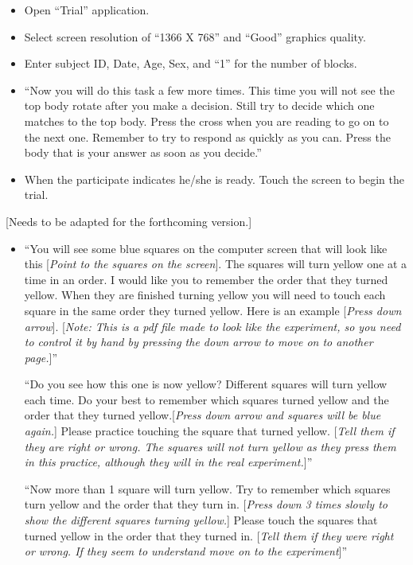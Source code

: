 \documentclass[idxtotoc,hyperref,openany]{labbook} %
\begin{document}
\begin{itemize}
\item Open ``Trial'' application.

\item Select screen resolution of ``1366 X 768'' and ``Good'' graphics quality.

\item Enter subject ID, Date, Age, Sex, and ``1'' for the number of blocks.

\item ``Now you will do this task a few more times. This time you will not see the top body rotate after you make a decision. Still try to decide which one matches to the top body. Press the cross when you are reading to go on to the next one. Remember to try to respond as quickly as you can. Press the body that is your answer as soon as you decide.''

\item When the participate indicates he/she is ready.  Touch the screen to begin the trial.

\end{itemize}




[Needs to be adapted for the forthcoming version.]

\begin{itemize}

\item ``You will see some blue squares on the computer screen that will look like this [\emph{Point to the squares on the screen}].  The squares will turn yellow one at a time in an order. I would like you to remember the order that they turned yellow. When they are finished turning yellow you will need to touch each square in the same order they turned yellow. Here is an example [\emph{Press down arrow}]. [\emph{Note: This is a pdf file made to look like the experiment, so you need to control it by hand by pressing the down arrow to move on to another page.}]''

``Do you see how this one is now yellow? Different squares will turn yellow each time.  Do your best to remember which squares turned yellow and the order that they turned yellow.[\emph{Press down arrow and squares will be blue again.}] Please practice touching the square that turned yellow. [\emph{Tell them if they are right or wrong. The squares will not turn yellow as they press them in this practice, although they will in the real experiment.}]''

``Now more than 1 square will turn yellow. Try to remember which squares turn yellow and the order that they turn in. [\emph{Press down 3 times slowly to show the different squares turning yellow.}] Please touch the squares that turned yellow in the order that they turned in. [\emph{Tell them if they were right or wrong. If they seem to understand move on to the experiment}]''

\end{itemize}
\end{document}
